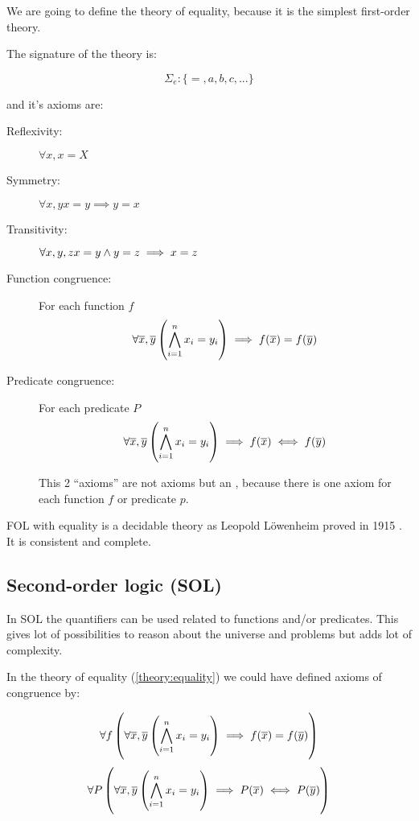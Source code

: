 \begin{example}

\label{theory:equality}

We are going to define the theory of equality, because it is the simplest first-order theory.

The signature of the theory is:

\[\Sigma_e:\{=,a,b,c,...\}\]

and it's axioms are:

\begin{description}
	\item[Reflexivity:	] $\forall x, x=X$
	\item[Symmetry:	] $\forall x,y x=y \implies y=x$
	\item[Transitivity:	] $\forall x,y,z x=y \wedge y=z \implies x=z$
	\item[Function congruence:] For each function $f$
	\[\forall \overline{x},\overline{y} \left( \bigwedge_{i=1}^n x_i = y_i \right) \implies f(\overline{x}) = f(\overline{y})\]
	\item[Predicate congruence:]  For each predicate $P$
	\[\forall \overline{x},\overline{y} \left( \bigwedge_{i=1}^n x_i = y_i \right) \implies f(\overline{x}) \iff f(\overline{y})\]

	This 2 ``axioms'' are not axioms but an , because there is one axiom for each function $f$ or predicate $p$.
\end{description}

\gls{FOL} with equality is a decidable theory as Leopold Löwenheim proved in 1915 \cite{EqualityIsDecidable}. It is consistent and complete.
\end{example}


\subsection{Second-order logic (SOL)}

In \gls{SOL} the quantifiers can be used related to functions and/or predicates. This gives lot of possibilities to reason about the universe and problems but adds lot of complexity. 

In the theory of equality (\ref{theory:equality}) we could have defined axioms of congruence by:

\[\forall f \left( \forall \overline{x},\overline{y} \left( \bigwedge_{i=1}^n x_i = y_i \right) \implies f(\overline{x}) = f(\overline{y}) \right)\]
\[\forall P \left( \forall \overline{x},\overline{y} \left( \bigwedge_{i=1}^n x_i = y_i \right) \implies P(\overline{x}) \iff P(\overline{y}) \right)\]

